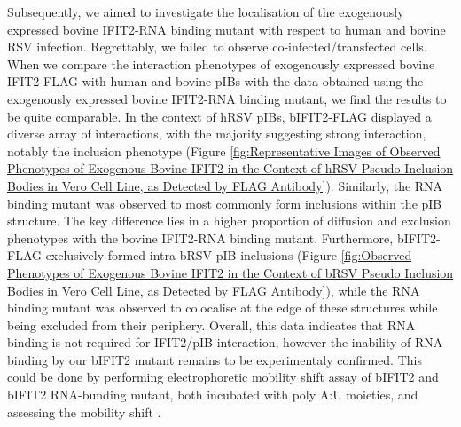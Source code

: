 Subsequently, we aimed to investigate the localisation of the exogenously expressed bovine IFIT2-RNA binding mutant with respect to human and bovine RSV infection. Regrettably, we failed to observe co-infected/transfected cells. When we compare the interaction phenotypes of exogenously expressed bovine IFIT2-FLAG with human and bovine pIBs with the data obtained using the exogenously expressed bovine IFIT2-RNA binding mutant, we find the results to be quite comparable. In the context of hRSV pIBs, bIFIT2-FLAG displayed a diverse array of interactions, with the majority suggesting strong interaction, notably the inclusion phenotype (Figure \ref{fig:Representative Images of Observed Phenotypes of Exogenous Bovine IFIT2 in the Context of hRSV Pseudo Inclusion Bodies in Vero Cell Line, as Detected by FLAG Antibody}). Similarly, the RNA binding mutant was observed to most commonly form inclusions within the pIB structure. The key difference lies in a higher proportion of diffusion and exclusion phenotypes with the bovine IFIT2-RNA binding mutant. Furthermore, bIFIT2-FLAG exclusively formed intra bRSV pIB inclusions (Figure \ref{fig:Observed Phenotypes of Exogenous Bovine IFIT2 in the Context of bRSV Pseudo Inclusion Bodies in Vero Cell Line, as Detected by FLAG Antibody}), while the RNA binding mutant was observed to colocalise at the edge of these structures while being excluded from their periphery. Overall, this data indicates that RNA binding is not required for IFIT2/pIB interaction, however the inability of RNA binding by our bIFIT2 mutant remains to be experimentaly confirmed. This could be done by performing electrophoretic mobility shift assay of bIFIT2 and bIFIT2 RNA-bunding mutant, both incubated with poly A:U moieties, and assessing the mobility shift \cite{Yang2012CrystalMechanisms, Hellman2007ElectrophoreticInteractions}.